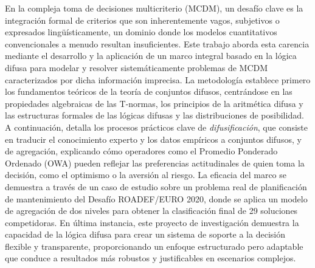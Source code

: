 \begin{poliabstract}[Resumen]
    En la compleja toma de decisiones multicriterio (MCDM), un desafío clave es la integración formal de criterios que son inherentemente vagos, subjetivos o expresados lingüísticamente, un dominio donde los modelos cuantitativos convencionales a menudo resultan insuficientes. Este trabajo aborda esta carencia mediante el desarrollo y la aplicación de un marco integral basado en la lógica difusa para modelar y resolver sistemáticamente problemas de MCDM caracterizados por dicha información imprecisa. La metodología establece primero los fundamentos teóricos de la teoría de conjuntos difusos, centrándose en las propiedades algebraicas de las T-normas, los principios de la aritmética difusa y las estructuras formales de las lógicas difusas y las distribuciones de posibilidad. A continuación, detalla los procesos prácticos clave de \textit{difusificación}, que consiste en traducir el conocimiento experto y los datos empíricos a conjuntos difusos, y de agregación, explicando cómo operadores como el Promedio Ponderado Ordenado (OWA) pueden reflejar las preferencias actitudinales de quien toma la decisión, como el optimismo o la aversión al riesgo. La eficacia del marco se demuestra a través de un caso de estudio sobre un problema real de planificación de mantenimiento del Desafío ROADEF/EURO 2020, donde se aplica un modelo de agregación de dos niveles para obtener la clasificación final de 29 soluciones competidoras. En última instancia, este proyecto de investigación demuestra la capacidad de la lógica difusa para crear un sistema de soporte a la decisión flexible y transparente, proporcionando un enfoque estructurado pero adaptable que conduce a resultados más robustos y justificables en escenarios complejos.
\end{poliabstract}
    
